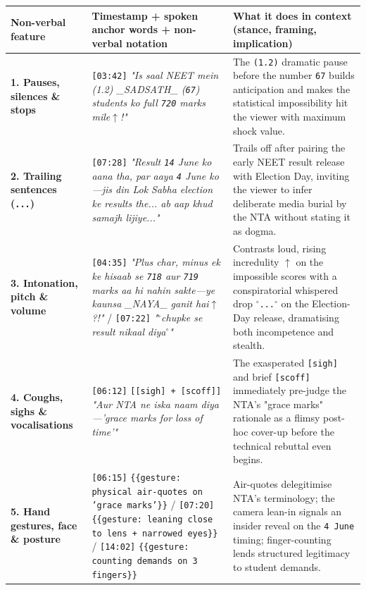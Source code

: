 \documentclass[10pt,a4paper]{article}
\begin{document}
\begin{longtable}{|p{}|p{}|p{}|}
\hline
Non-verbal feature & Timestamp + spoken anchor words + non-verbal notation & What it does in context (stance, framing, implication) \\ \hline \endhead
\textbf{1. Pauses, silences \& stops} & \texttt{[03:42]} \textit{"Is saal NEET mein (1.2) \_SADSATH\_ (\texttt{67}) students ko full \texttt{720} marks mile$\uparrow$!"} & The \texttt{(1.2)} dramatic pause before the number \texttt{67} builds anticipation and makes the statistical impossibility hit the viewer with maximum shock value. \\ \hline
\textbf{2. Trailing sentences (\texttt{...})} & \texttt{[07:28]} \textit{"Result \texttt{14} June ko aana tha, par aaya \texttt{4} June ko---jis din Lok Sabha election ke results the... ab aap khud samajh lijiye..."} & Trails off after pairing the early NEET result release with Election Day, inviting the viewer to infer deliberate media burial by the NTA without stating it as dogma. \\ \hline
\textbf{3. Intonation, pitch \& volume} & \texttt{[04:35]} \textit{"Plus char, minus ek ke hisaab se \texttt{718} aur \texttt{719} marks aa hi nahin sakte---ye kaunsa \_NAYA\_ ganit hai$\uparrow$?!"} / \texttt{[07:22]} \textit{"$^\circ$chupke se result nikaal diya$^\circ$"} & Contrasts loud, rising incredulity \texttt{$\uparrow$} on the impossible scores with a conspiratorial whispered drop \texttt{$^\circ$...$^\circ$} on the Election-Day release, dramatising both incompetence and stealth. \\ \hline
\textbf{4. Coughs, sighs \& vocalisations} & \texttt{[06:12]} \texttt{[[sigh] + [scoff]]} \textit{"Aur NTA ne iska naam diya---'grace marks for loss of time'"} & The exasperated \texttt{[sigh]} and brief \texttt{[scoff]} immediately pre-judge the NTA's "grace marks" rationale as a flimsy post-hoc cover-up before the technical rebuttal even begins. \\ \hline
\textbf{5. Hand gestures, face \& posture} & \texttt{[06:15]} \texttt{\{\{gesture: physical air-quotes on 'grace marks'\}\}} / \texttt{[07:20]} \texttt{\{\{gesture: leaning close to lens + narrowed eyes\}\}} / \texttt{[14:02]} \texttt{\{\{gesture: counting demands on 3 fingers\}\}} & Air-quotes delegitimise NTA's terminology; the camera lean-in signals an insider reveal on the \texttt{4 June} timing; finger-counting lends structured legitimacy to student demands. \\ \hline
\end{longtable}
\end{document}
